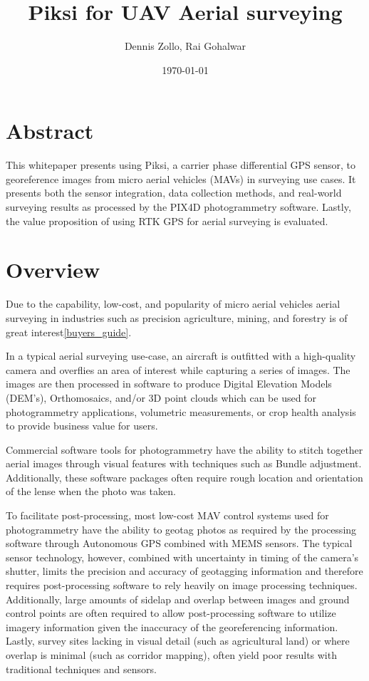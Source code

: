 \documentclass{article}
\title{Piksi for UAV Aerial surveying}
\author{Dennis Zollo, Rai Gohalwar}
\date{\today}
\begin{document}
\maketitle

\thispagestyle{firstpage}

\section{Abstract}
\label{sec:abstract}
This whitepaper presents using Piksi, a carrier phase differential GPS sensor, to georeference
 images from micro aerial vehicles (MAVs) in surveying use cases.
It presents both the sensor integration, data collection methods, and real-world surveying results
as processed by the PIX4D photogrammetry software.  Lastly, the value proposition of using RTK GPS
for aerial surveying is evaluated.
\tableofcontents
\newpage
\section{Overview}
\label{sec:Overview}
Due to the capability, low-cost, and popularity of micro aerial vehicles aerial surveying in industries such as precision agriculture, mining, and forestry is of great interest\ref{buyers_guide}.

In a typical aerial surveying use-case, an aircraft is outfitted with a high-quality camera and
overflies an area of interest while capturing a series of images.  The images are then processed in
software to produce Digital Elevation Models (DEM's), Orthomosaics, and/or 3D point clouds which
can be used for photogrammetry applications, volumetric measurements, or crop health analysis to
provide business value for users.

Commercial software tools for photogrammetry have the ability to stitch together aerial images
through visual features with techniques such as Bundle adjustment.  Additionally, these software packages often
require rough location and orientation of the lense when the photo was taken.

To facilitate post-processing, most low-cost MAV control systems used for photogrammetry have
the ability to geotag photos as required by the processing software through Autonomous GPS combined
with MEMS sensors.  The typical sensor technology, however, combined with uncertainty in timing of the
camera's shutter, limits the precision and accuracy of geotagging information and therefore requires
post-processing software to rely heavily on image processing techniques. Additionally, large
amounts of sidelap and overlap between images and ground control points are often required to allow
post-processing software to utilize imagery information given the inaccuracy of the georeferencing
information.  Lastly, survey sites lacking in visual detail (such as agricultural land) or where
overlap is minimal (such as corridor mapping), often yield poor results with traditional techniques
and sensors.
\end{document}
